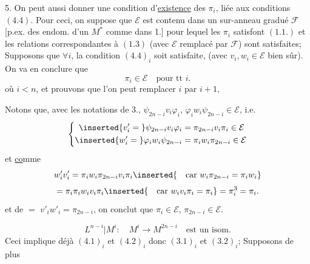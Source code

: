 5. On peut aussi donner une condition d'\uline{existence} des $\pi_i$, liée aux conditions $(4.4)$. Pour ceci, on suppose que $\mathcal E$ est contenu dans un sur-anneau gradué $\mathcal F$ [p.ex.  des endom. d'un $M^*$ comme dans 1.] pour lequel les $\pi_i$ satisfont $(1.1.)$ et les relations correspondantes à $(1.3)$ (avec $\mathcal E$ remplacé par $\mathcal F$) sont satisfaites;  Supposons que $\forall i$, la condition $(4.4)_i$ soit satisfaite, (avec $v_i,w_i\in\mathcal E$ bien sûr). On va en conclure que
\[
\pi_i\in\mathcal E\quad\text{pour tt }i.
\tag{5.1}
\]
 où $i<n$, et prouvons que l'on peut remplacer $i$ par $i+1$, 

Notons que, avec les notations de 3.,    $\psi_{2n-i}v_i\varphi_i$, $\varphi_iw_i\psi_{2n-i}\in\mathcal E$, i.e.
\[
\left\{\begin{aligned}
\inserted{v'_i={}}\psi_{2n-i}v_i\varphi_i&=\pi_{2n-i}v_i\pi_i\in\mathcal E\\
\inserted{w'_i={}}\varphi_iw_i\psi_{2n-i}&=\pi_iw_i\pi_{2n-i}\in\mathcal E
\end{aligned}\right.
\]
et \uline{co}mme 
\[
w'_iv'_i=\pi_iw_i\pi_{2n-i}v_i\pi_i
\inserted{\quad\text{car }w_i\pi_{2n-i}=\pi_iw_i}\]
\[
=\pi_i\pi_iw_iv_i\pi_i
\inserted{\quad\text{car }w_iv_i\pi_i=\pi_i}
=\pi_i^3=\pi_i.
\]
et de $=$  $v'_iw'_i=\pi_{2n-i}$, on conclut que $\pi_i\in\mathcal E$, $\pi_{2n-i}\in\mathcal E$.

\[
L^{n-i}|M^i:\quad M^i\longrightarrow M^{2n-i}\quad\text{est un isom.}
\tag*{$(6.1)_i$}
\]
Ceci implique déjà $(4.1)_i$ et $(4.2)_i$ donc $(3.1)_i$ et $(3.2)_i$;  Supposons de plus

